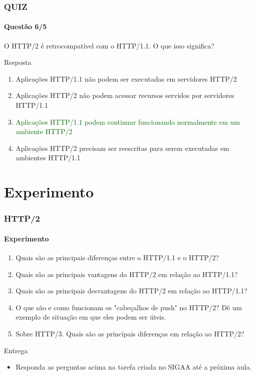 \documentclass[
	9pt, %
	t, %
]{beamer}
\begin{document}
\begin{frame}
	\frametitle{QUIZ}
	\framesubtitle{Questão 6/5}

	{\Large O HTTP/2 é retrocompatível com o HTTP/1.1. O que isso significa? }

	\begin{exampleblock}{Resposta}
		\begin{enumerate}[a]
			\item Aplicações HTTP/1.1 não podem ser executadas em servidores HTTP/2
			\item Aplicações HTTP/2 não podem acessar recursos servidos por servidores HTTP/1.1
			\item \textcolor{darkgreen}{Aplicações HTTP/1.1 podem continuar funcionando normalmente em um ambiente HTTP/2}
			\item Aplicações HTTP/2 precisam ser reescritas para serem executadas em ambientes HTTP/1.1
		\end{enumerate}
	\end{exampleblock}

\end{frame}

\section{Experimento}

\begin{frame}
	\frametitle{HTTP/2}
	\framesubtitle{Experimento}

	\begin{enumerate}
		\item Quais são as principais diferenças entre o HTTP/1.1 e o HTTP/2?
		\item Quais são as principais vantagens do HTTP/2 em relação ao HTTP/1.1?
		\item Quais são as principais desvantagens do HTTP/2 em relação ao HTTP/1.1?
		\item O que são e como funcionam os "cabeçalhos de push" no HTTP/2? Dê um exemplo de situação em que eles podem ser úteis.
		\item Sobre HTTP/3. Quais são as principais diferenças em relação ao HTTP/2?
	\end{enumerate}

	\begin{exampleblock}{Entrega}
		\begin{itemize}
			\item Responda as perguntas acima na tarefa criada no SIGAA até a próxima aula.
		\end{itemize}
	\end{exampleblock}

\end{frame}
\end{document}
